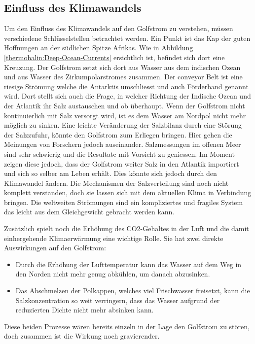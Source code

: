 \subsection{Einfluss des Klimawandels}\label{thermohalin:EinflussKlimawandel}

Um den Einfluss des Klimawandels auf den Golfstrom zu verstehen, müssen verschiedene Schlüsselstellen betrachtet werden.
Ein Punkt ist das Kap der guten Hoffnungen an der südlichen Spitze Afrikas.
Wie in Abbildung \ref{thermohalin:Deep-Ocean-Currents} ersichtlich ist, befindet sich dort eine Kreuzung.
Der Golfstrom setzt sich dort aus Wasser aus dem indischen Ozean und aus Wasser des Zirkumpolarstromes zusammen. Der conveyor Belt ist eine riesige Strömung welche die Antarktis umschliesst und auch Förderband genannt wird.
Dort stellt sich auch die Frage, in welcher Richtung der Indische Ozean und der Atlantik ihr Salz austauschen und ob überhaupt. Wenn der Golfstrom nicht kontinuierlich mit Salz versorgt wird, ist es dem Wasser am Nordpol nicht mehr möglich zu sinken. Eine leichte Veränderung der Salzbilanz durch eine Störung der Salzzufuhr, könnte den Golfstrom zum Erliegen bringen. Hier gehen die Meinungen von Forschern jedoch auseinander. Salzmessungen im offenen Meer sind sehr schwierig und die Resultate mit Vorsicht zu geniessen.
Im Moment zeigen diese jedoch, dass der Golfstrom weiter Salz in den Atlantik importiert und sich so selber am Leben erhält. Dies könnte sich jedoch durch den Klimawandel ändern. Die Mechanismen der Salzverteilung sind noch nicht komplett verstanden, doch sie lassen sich mit dem aktuellen Klima in Verbindung bringen. Die weltweiten Strömungen sind ein kompliziertes und fragiles System das leicht aus dem Gleichgewicht gebracht werden kann. 

Zusätzlich spielt noch die Erhöhung des CO2-Gehaltes in der Luft und die damit einhergehende Klimaerwärmung eine wichtige Rolle. Sie hat zwei direkte Auswirkungen auf den Golfstrom:

\begin{itemize}
	\item Durch die Erhöhung der Lufttemperatur kann das Wasser auf dem Weg in den Norden nicht mehr genug abkühlen, um danach abzusinken.
	\item Das Abschmelzen der Polkappen, welches viel Frischwasser freisetzt, kann die Salzkonzentration so weit verringern, dass das Wasser aufgrund der reduzierten Dichte nicht mehr absinken kann.
\end{itemize}
Diese beiden Prozesse wären bereits einzeln in der Lage den Golfstrom zu stören, doch zusammen ist die Wirkung noch gravierender.

